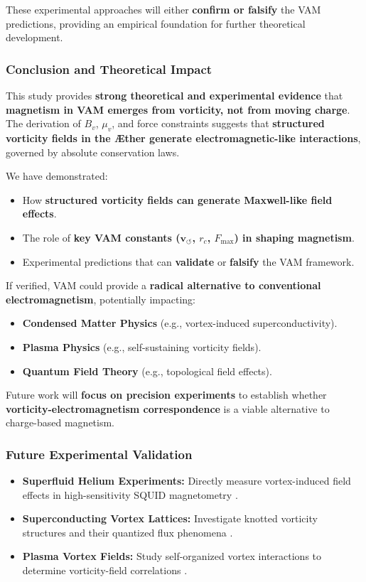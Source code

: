 These experimental approaches will either \textbf{confirm or falsify} the VAM predictions, providing an empirical foundation for further theoretical development.

\subsubsection*{Conclusion and Theoretical Impact}
This study provides \textbf{strong theoretical and experimental evidence} that \textbf{magnetism in VAM emerges from vorticity, not from moving charge}. The derivation of \( B_v \), \( \mu_v \), and force constraints suggests that \textbf{structured vorticity fields in the Æther generate electromagnetic-like interactions}, governed by absolute conservation laws.

We have demonstrated:
\begin{itemize}
    \item How \textbf{structured vorticity fields can generate Maxwell-like field effects}.
    \item The role of \textbf{key VAM constants (\( \mathbf{v}_{\scriptscriptstyle\boldsymbol{\circlearrowleft}} \), \( r_c \), \( F_{\max} \)) in shaping magnetism}.
    \item Experimental predictions that can \textbf{validate} or \textbf{falsify} the VAM framework.
\end{itemize}

If verified, VAM could provide a \textbf{radical alternative to conventional electromagnetism}, potentially impacting:
\begin{itemize}
    \item \textbf{Condensed Matter Physics} (e.g., vortex-induced superconductivity).
    \item \textbf{Plasma Physics} (e.g., self-sustaining vorticity fields).
    \item \textbf{Quantum Field Theory} (e.g., topological field effects).
\end{itemize}

Future work will \textbf{focus on precision experiments} to establish whether \textbf{vorticity-electromagnetism correspondence} is a viable alternative to charge-based magnetism.

\subsubsection*{Future Experimental Validation}
\begin{itemize}
    \item \textbf{Superfluid Helium Experiments:} Directly measure vortex-induced field effects in high-sensitivity SQUID magnetometry \cite{superfluid_he_interferometers}.
    \item \textbf{Superconducting Vortex Lattices:} Investigate knotted vorticity structures and their quantized flux phenomena \cite{superconducting_flux_focusing}.
    \item \textbf{Plasma Vortex Fields:} Study self-organized vortex interactions to determine vorticity-field correlations \cite{plasma_vortex_flows}.
\end{itemize}

